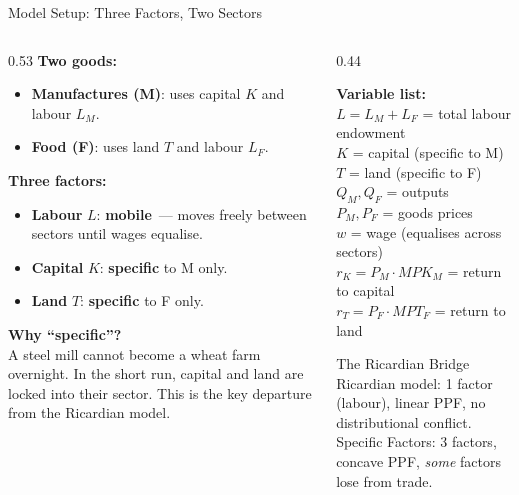 \documentclass[aspectratio=169]{beamer}
\begin{document}
\begin{frame}[shrink=5]{Model Setup: Three Factors, Two Sectors}
\begin{columns}[T]
\begin{column}{0.53\textwidth}
\textbf{Two goods:}
\begin{itemize}\small
  \item \textbf{Manufactures (M)}: uses capital $K$ and
        labour $L_M$.
  \item \textbf{Food (F)}: uses land $T$ and labour $L_F$.
\end{itemize}
\vspace{0.3em}
\textbf{Three factors:}
\begin{itemize}\small
  \item \textbf{Labour} $L$:
        \textcolor{AccentTeal}{\textbf{mobile}}~--- moves
        freely between sectors until wages equalise.
  \item \textbf{Capital} $K$:
        \textcolor{AccentRed}{\textbf{specific}} to M only.
  \item \textbf{Land} $T$:
        \textcolor{AccentRed}{\textbf{specific}} to F only.
\end{itemize}
\vspace{0.3em}
\textbf{Why ``specific''?}\\
A steel mill cannot become a wheat farm overnight.
In the short run, capital and land are locked into their
sector.  This is the key departure from the Ricardian
model.
\end{column}
\begin{column}{0.44\textwidth}
\begin{varbox}
\small\textbf{Variable list:}\\[0.2em]
$L=L_M+L_F$ = total labour endowment\\
$K$ = capital (specific to M)\\
$T$ = land (specific to F)\\
$Q_M, Q_F$ = outputs\\
$P_M, P_F$ = goods prices\\
$w$ = wage (equalises across sectors)\\
$r_K = P_M \cdot MPK_M$ = return to capital\\
$r_T = P_F \cdot MPT_F$ = return to land
\end{varbox}
\vspace{0.3em}
\begin{insight}{The Ricardian Bridge}
\footnotesize Ricardian model: 1 factor (labour), linear
PPF, no distributional conflict.\\[0.2em]
Specific Factors: 3 factors, concave PPF,
\emph{some} factors lose from trade.
\end{insight}
\end{column}
\end{columns}
\end{frame}
\end{document}
